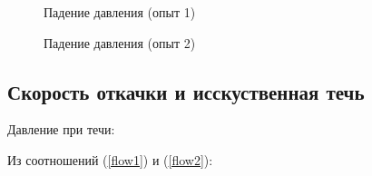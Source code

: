 \documentclass[a4paper,12pt]{article} %
\begin{document}
\begin{figure}[h]
    \caption{Падение давления (опыт 1)}
	\label{rise1}
\end{figure}

\begin{figure}[h]
    \caption{Падение давления (опыт 2)}
	\label{rise2}
\end{figure}

\FloatBarrier

\subsection*{Скорость откачки и исскуственная течь}

Давление при течи:
\begin{equation}
	
\end{equation}
\begin{equation}
	
\end{equation}
\begin{equation}
	
\end{equation}

Из соотношений (\ref{flow1}) и (\ref{flow2}):
\begin{equation}
	
\end{equation}

\end{document}
